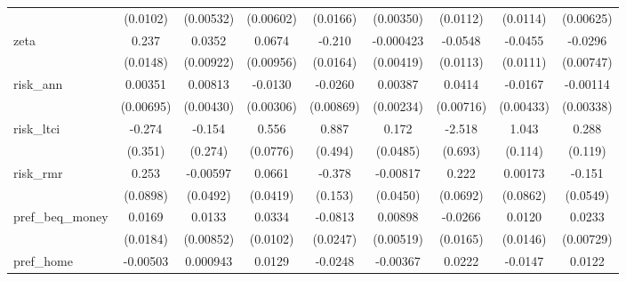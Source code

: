 {\begin{tabular}{l*{8}{c}}
            &    (0.0102)         &   (0.00532)         &   (0.00602)         &    (0.0166)         &   (0.00350)         &    (0.0112)         &    (0.0114)         &   (0.00625)         \\
[1em]
zeta        &       0.237\sym{***}&      0.0352\sym{***}&      0.0674\sym{***}&      -0.210\sym{***}&   -0.000423         &     -0.0548\sym{***}&     -0.0455\sym{***}&     -0.0296\sym{***}\\
            &    (0.0148)         &   (0.00922)         &   (0.00956)         &    (0.0164)         &   (0.00419)         &    (0.0113)         &    (0.0111)         &   (0.00747)         \\
[1em]
risk\_ann    &     0.00351         &     0.00813         &     -0.0130\sym{***}&     -0.0260\sym{**} &     0.00387         &      0.0414\sym{***}&     -0.0167\sym{***}&    -0.00114         \\
            &   (0.00695)         &   (0.00430)         &   (0.00306)         &   (0.00869)         &   (0.00234)         &   (0.00716)         &   (0.00433)         &   (0.00338)         \\
[1em]
risk\_ltci   &      -0.274         &      -0.154         &       0.556\sym{***}&       0.887         &       0.172\sym{***}&      -2.518\sym{***}&       1.043\sym{***}&       0.288\sym{*}  \\
            &     (0.351)         &     (0.274)         &    (0.0776)         &     (0.494)         &    (0.0485)         &     (0.693)         &     (0.114)         &     (0.119)         \\
[1em]
risk\_rmr    &       0.253\sym{**} &    -0.00597         &      0.0661         &      -0.378\sym{*}  &    -0.00817         &       0.222\sym{**} &     0.00173         &      -0.151\sym{**} \\
            &    (0.0898)         &    (0.0492)         &    (0.0419)         &     (0.153)         &    (0.0450)         &    (0.0692)         &    (0.0862)         &    (0.0549)         \\
[1em]
pref\_beq\_money&      0.0169         &      0.0133         &      0.0334\sym{**} &     -0.0813\sym{***}&     0.00898         &     -0.0266         &      0.0120         &      0.0233\sym{**} \\
            &    (0.0184)         &   (0.00852)         &    (0.0102)         &    (0.0247)         &   (0.00519)         &    (0.0165)         &    (0.0146)         &   (0.00729)         \\
[1em]
pref\_home   &    -0.00503         &    0.000943         &      0.0129         &     -0.0248         &    -0.00367         &      0.0222         &     -0.0147         &      0.0122         \\

\end{tabular}}
